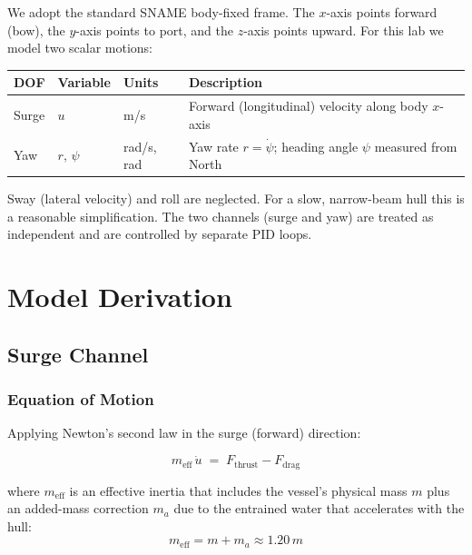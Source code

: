 \documentclass[../../book.tex]{subfiles}
\begin{document}
We adopt the standard SNAME body-fixed frame.  The $x$-axis points
forward (bow), the $y$-axis points to port, and the $z$-axis points
upward.  For this lab we model two scalar motions:

\vspace{6pt}
\begin{center}
\begin{tabular}{C{1.4cm} C{1.4cm} C{1.4cm} L{8.2cm}}
  \textbf{DOF} & \textbf{Variable} & \textbf{Units} & \textbf{Description} \\
  \midrule
  Surge & $u$ & m/s &
    Forward (longitudinal) velocity along body $x$-axis \\
  Yaw   & $r,\,\psi$ & rad/s, rad &
    Yaw rate $r = \dot{\psi}$; heading angle $\psi$ measured from North \\
  \bottomrule
\end{tabular}
\end{center}
\vspace{6pt}

Sway (lateral velocity) and roll are neglected.  For a slow,
narrow-beam hull this is a reasonable simplification.  The two channels
(surge and yaw) are treated as independent and are controlled by
separate PID loops.

\section{Model Derivation}

\subsection{Surge Channel}

\subsubsection{Equation of Motion}

Applying Newton's second law in the surge (forward) direction:

\begin{equation}
  m_{\mathrm{eff}}\,\dot{u} \;=\; F_{\mathrm{thrust}} - F_{\mathrm{drag}}
  \label{eq:surge_newton}
\end{equation}

where $m_{\mathrm{eff}}$ is an effective inertia that includes the vessel's
physical mass $m$ plus an added-mass correction $m_a$ due to the entrained
water that accelerates with the hull:
\[
  m_{\mathrm{eff}} = m + m_a \approx 1.20\,m
\]
\end{document}
